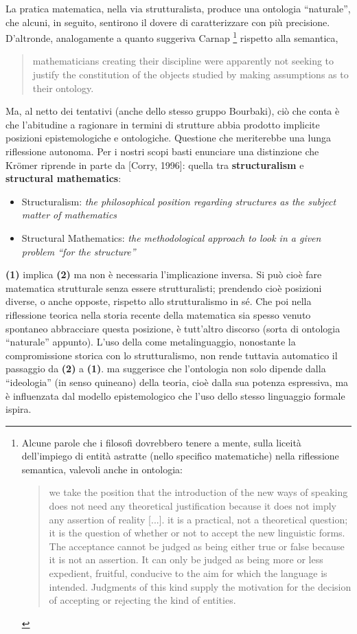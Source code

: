 	La pratica matematica, nella via strutturalista, produce una ontologia ``naturale'', che alcuni, in seguito, sentirono il dovere di caratterizzare con più precisione. D'altronde, analogamente a quanto suggeriva Carnap \footnote{Alcune parole che i filosofi dovrebbero tenere a mente, sulla liceità dell'impiego di entità astratte (nello specifico matematiche) nella riflessione semantica, valevoli anche in ontologia:
	\begin{quote}
		we take the position that the introduction of the new ways of speaking does not need any theoretical justification because it does not imply any assertion of reality [...].  it is a practical, not a theoretical question; it is the question of whether or not to accept the new linguistic forms. The acceptance cannot be judged as being either true or false because it is not an assertion. It can only be judged as being more or less expedient, fruitful, conducive to the aim for which the language is intended. Judgments of this kind supply the motivation for the decision of accepting or rejecting the kind of entities. \cite{carnap1956meaning}
\end{quote}} rispetto alla semantica,
\begin{quote}
	mathematicians creating their discipline were apparently not seeking to justify the constitution of the	objects studied by making assumptions as to their ontology. \cite{kromer2007tool}
\end{quote}
Ma, al netto dei tentativi (anche dello stesso gruppo Bourbaki), ciò che conta è che l'abitudine a ragionare in termini di strutture abbia prodotto implicite posizioni epistemologiche e ontologiche.
Questione che meriterebbe una lunga riflessione autonoma. Per i nostri scopi basti enunciare una distinzione che Kr\"omer riprende in parte da [Corry, 1996]: quella tra \textbf{structuralism} e \textbf{structural mathematics}:
\begin{itemize}
	\item[\textbf{(1)}] Structuralism: \textit{the philosophical
		position regarding structures as the subject matter of mathematics}
	\item[\textbf{(2)}] Structural Mathematics: \textit{the methodological approach to look in a given problem
		“for the structure”}
\end{itemize}
\begin{remark}
	\textbf{(1)} implica \textbf{(2)} ma non è necessaria l'implicazione inversa. Si può cioè fare matematica strutturale senza essere strutturalisti; prendendo cioè posizioni diverse, o anche opposte, rispetto allo strutturalismo in sé. Che poi nella riflessione teorica nella storia recente della matematica sia spesso venuto spontaneo abbracciare questa posizione, è tutt'altro discorso (sorta di ontologia ``naturale'' appunto). L'uso della \CT come metalinguaggio, nonostante la compromissione storica con lo strutturalismo, non rende tuttavia automatico il passaggio da \textbf{(2)} a \textbf{(1)}. ma suggerisce che l'ontologia non solo dipende dalla ``ideologia'' (in senso quineano) della teoria, cioè dalla sua potenza espressiva, ma è influenzata dal modello epistemologico che l'uso dello stesso linguaggio formale ispira.
\end{remark}


